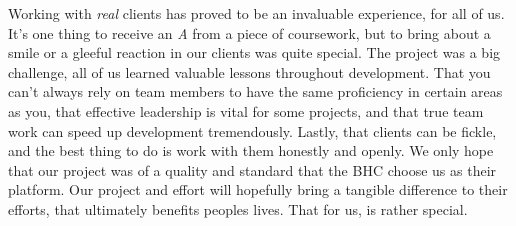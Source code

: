 \documentclass{l3proj}
\begin{document}
Working with \textit{real} clients has proved to be an invaluable experience, for all of us. It's one thing to receive an \textit{A} from a piece of coursework, but to bring about a smile or a gleeful reaction in our clients was quite special. The project was a big challenge, all of us learned valuable lessons throughout development. That you can't always rely on team members to have the same proficiency in certain areas as you, that effective leadership is vital for some projects, and that true team work can speed up development tremendously. Lastly, that clients can be fickle, and the best thing to do is work with them honestly and openly. We only hope that our project was of a quality and standard that the BHC choose us as their platform. Our project and effort will hopefully bring a tangible difference to their efforts, that ultimately benefits peoples lives. That for us, is rather special.


\newpage


\end{document}
